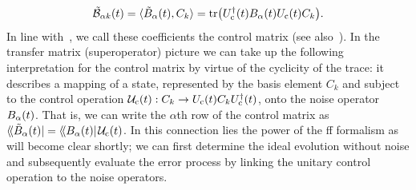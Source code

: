 \begin{equation}\label{eq:ff:control_matrix}
    \tilde{\mathcal{B}}_{\alpha k}(t) = \langle\tilde{B}_\alpha(t), C_k\rangle  = \tr(U_{\mathrm{c}}^\dagger(t)B_\alpha(t)U_{\mathrm{c}}(t)C_k).
\end{equation}
In line with~\citet{Green2013}, we call these coefficients the control matrix (see also~).
In the transfer matrix (superoperator) picture we can take up the following interpretation for the control matrix by virtue of the cyclicity of the trace: it describes a mapping of a state, represented by the basis element $C_k$ and subject to the control operation $\mathcal{U}_{\mathrm{c}}(t): C_k\rightarrow U_{\mathrm{c}}(t) C_kU_{\mathrm{c}}^\dagger(t)$, onto the noise operator $B_\alpha(t)$.
That is, we can write the $\alpha$th row of the control matrix as $\langle\!\langle{\Bat(t)}\rvert = \dbra{\Ba(t)}\liouvUc(t)$.
In this connection lies the power of the \gls{ff} formalism as will become clear shortly; we can first determine the ideal evolution without noise and subsequently evaluate the error process by linking the unitary control operation to the noise operators.

